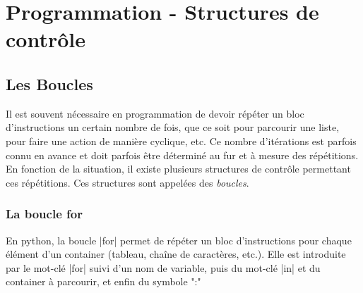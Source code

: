 \documentclass[11pt, a4paper]{book}
\begin{document}
\setcounter{chapter}{7}
\chapter{Programmation - Structures de contrôle}

\vspace{1cm}

\section{Les Boucles}
Il est souvent nécessaire en programmation de devoir répéter un bloc d'instructions un certain nombre de fois, que ce soit pour parcourir une liste, pour faire une action de manière cyclique, etc. Ce nombre d'itérations est parfois connu en avance et doit parfois être déterminé au fur et à mesure des répétitions. En fonction de la situation, il existe plusieurs structures de contrôle permettant ces répétitions. Ces structures sont appelées des \textit{boucles}.


\subsection{La boucle \textsf{for}}

\begin{defi} En python, la boucle |for| permet de répéter un bloc d'instructions pour chaque élément d'un container (tableau, chaîne de caractères, etc.). Elle est introduite par le mot-clé |for| suivi d'un nom de variable, puis du mot-clé |in| et du container à parcourir, et enfin du symbole ":" 
\end{defi}
\end{document}

